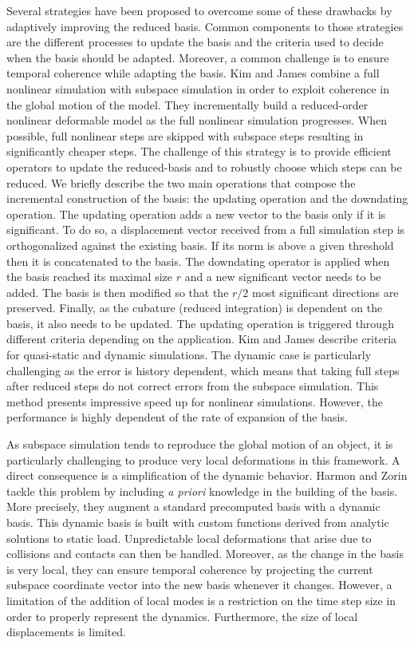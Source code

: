 Several strategies have been proposed to overcome some of these drawbacks by adaptively improving the reduced basis. Common components to those strategies are the different processes to update the basis and the criteria used to decide when the basis should be adapted. Moreover, a common challenge is to ensure temporal coherence while adapting the basis.
Kim and James \cite{Kim2009Skipping} combine a full nonlinear simulation with subspace simulation in order to exploit coherence in the global motion of the model.
They incrementally build a reduced-order nonlinear deformable model as the full nonlinear simulation progresses. When possible, full nonlinear steps are skipped with subspace steps resulting in significantly cheaper steps. The challenge of this strategy is to provide efficient operators to update the reduced-basis and to robustly choose which steps can be reduced. We briefly describe the two main operations that compose the incremental construction of the basis: the updating operation and the downdating operation. The updating operation adds a new vector to the basis only if it is significant. To do so, a displacement vector received from a full simulation step is orthogonalized against the existing basis. If its norm is above a given threshold then it is concatenated to the basis. The downdating operator is applied when the basis reached its maximal size $r$ and a new significant vector needs to be added. The basis is then modified so that the $r/2$ most significant directions are preserved. Finally, as the cubature (reduced integration) is dependent on the basis, it also needs to be updated. The updating operation is triggered through different criteria depending on the application. Kim and James describe criteria for quasi-static and dynamic simulations. The dynamic case is particularly challenging as the error is history dependent, which means that taking full steps after reduced steps do not correct errors from the subspace simulation. This method presents impressive speed up for nonlinear simulations. However, the performance is highly dependent of the rate of expansion of the basis.

As subspace simulation tends to reproduce the global motion of an object, it is particularly challenging to produce very local deformations in this framework. A direct consequence is a simplification of the dynamic behavior. Harmon and Zorin \cite{Harmon2013} tackle this problem by including \textit{a priori} knowledge in the building of the basis. More precisely, they augment a standard precomputed basis with a dynamic basis. This dynamic basis is built with custom functions derived from analytic solutions to static load. Unpredictable local deformations that arise due to collisions and contacts can then be handled. Moreover, as the change in the basis is very local, they can ensure temporal coherence by projecting the current subspace coordinate vector into the new basis whenever it changes. However, a limitation of the addition of local modes is a restriction on the time step size in order to properly represent the dynamics. Furthermore, the size of local displacements is limited.

